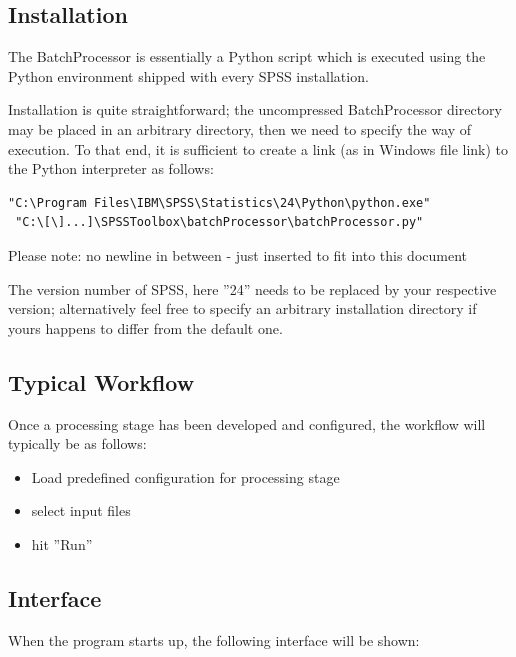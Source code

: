 \documentclass[]{article}
\begin{document}
\subsection{Installation}
The BatchProcessor is essentially a Python script which is executed using the Python environment shipped with every SPSS installation. 

Installation is quite straightforward; the uncompressed BatchProcessor directory may be placed in an arbitrary directory, then we need to specify the way of execution. To that end, it is sufficient to create a link (as in Windows file link) to the Python interpreter as follows:
\begin{verbatim}
"C:\Program Files\IBM\SPSS\Statistics\24\Python\python.exe"
 "C:\[\]...]\SPSSToolbox\batchProcessor\batchProcessor.py"
\end{verbatim}
\begin{small}
	Please note: no newline in between - just inserted to fit into this document
\end{small}

The version number of SPSS, here ''24'' needs to be replaced by your respective version; alternatively feel free to specify an arbitrary installation directory if yours happens to differ from the default one. 

\subsection{Typical Workflow}
Once a processing stage has been developed and configured, the workflow will typically be as follows:
\begin{itemize}[noitemsep]
	\item Load predefined configuration for processing stage
	\item select input files
	\item hit ''Run''
\end{itemize}

\subsection{Interface}
When the program starts up, the following interface will be shown:\\
\end{document}
